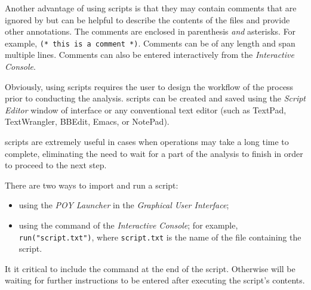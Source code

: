 Another advantage of using scripts is that they may contain comments that are ignored by \poy but can be helpful to describe the contents of the files and provide other annotations. The comments are enclosed in parenthesis \emph{and} asterisks. For example, \texttt{(* this is a comment *)}. Comments can be of any length and span multiple lines. Comments can also be entered interactively from the \emph{Interactive Console}.

Obviously, using scripts requires the user to design the workflow of the process prior to conducting the analysis. \poy scripts can be created and saved using the \emph{Script Editor} window of \poy interface or any conventional text editor (such as TextPad, TextWrangler, BBEdit, Emacs, or NotePad).

\poy scripts are extremely useful in cases when operations may take a long time to complete, eliminating the need to wait for a part of the analysis to finish in order to proceed to the next step.

There are two ways to import and run a script:
\begin{itemize}
    \item using the \emph{POY Launcher} in the \emph{Graphical User Interface};
    \item using the command  of the \emph{Interactive Console}; for example, \texttt{run("script.txt")}, where \texttt{script.txt} is the name of the file containing the script.
\end{itemize}

It it critical to include the command  at the end of the script. Otherwise \poy will be waiting for further instructions to be entered after executing the script's contents.

